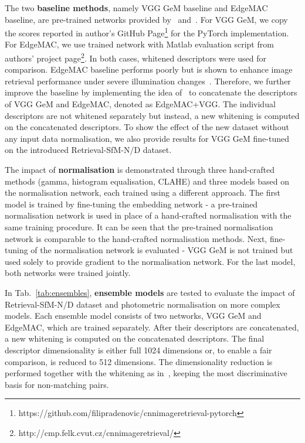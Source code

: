 The two {\bf baseline methods}, namely VGG GeM baseline and EdgeMAC baseline, are pre-trained networks provided by~\cite{Radenovic-TPAMI18} and~\cite{Radenovic-ECCV18}. For VGG GeM, we copy the scores reported in author's GitHub Page\footnote{https://github.com/filipradenovic/cnnimageretrieval-pytorch} for the PyTorch implementation. For EdgeMAC, we use trained network with Matlab evaluation script from authors' project page\footnote{http://cmp.felk.cvut.cz/cnnimageretrieval/}. In both cases, whitened descriptors were used for comparison. EdgeMAC baseline performs poorly but is shown to enhance image retrieval performance under severe illumination changes~\cite{Radenovic-ECCV18}. Therefore, we further improve the baseline by implementing the idea of~\cite{Chum-CVPR06} to concatenate the descriptors of VGG GeM and EdgeMAC, denoted as EdgeMAC+VGG. The individual descriptors are not whitened separately but instead, a new whitening is computed on the concatenated descriptors. To show the effect of the new dataset without any input data normalisation, we also provide results for VGG GeM fine-tuned on the introduced Retrieval-SfM-N/D dataset.

The impact of {\bf normalisation} is demonstrated through three hand-crafted methods (gamma, histogram equalisation, CLAHE) and three models based on the normalisation network, each trained using a different approach. The first model is trained by fine-tuning the embedding network - a pre-trained normalisation network is used in place of a hand-crafted normalisation with the same training procedure. It can be seen that the pre-trained normalisation network is comparable to the hand-crafted normalisation methods. Next, fine-tuning of the normalisation network is evaluated - VGG GeM is not trained but used solely to provide gradient to the normalisation network. For the last model, both networks were trained jointly.

In Tab.~\ref{tab:ensembles}, {\bf ensemble models} are tested to evaluate the impact of Retrieval-SfM-N/D dataset and photometric normalisation on more complex models. Each ensemble model consists of two networks, VGG GeM and EdgeMAC, which are trained separately. After their descriptors are concatenated, a new whitening is computed on the concatenated descriptors. The final descriptor dimensionality is either full 1024 dimensions or, to enable a fair comparison, is reduced to 512 dimensions. The dimensionality reduction is performed together with the whitening as in~\cite{Radenovic-TPAMI18}, keeping the most discriminative basis for non-matching pairs.

